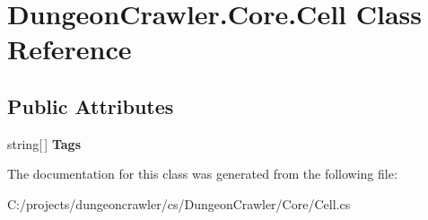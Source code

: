 \hypertarget{class_dungeon_crawler_1_1_core_1_1_cell}{}\section{Dungeon\+Crawler.\+Core.\+Cell Class Reference}
\label{class_dungeon_crawler_1_1_core_1_1_cell}
\subsection*{Public Attributes}
\begin{DoxyCompactItemize}
\item 
\hypertarget{class_dungeon_crawler_1_1_core_1_1_cell_aa3d2bdde1e93cc3604f3aa1d915eeae7}{}string\mbox{[}$\,$\mbox{]} {\bfseries Tags}\label{class_dungeon_crawler_1_1_core_1_1_cell_aa3d2bdde1e93cc3604f3aa1d915eeae7}

\end{DoxyCompactItemize}


The documentation for this class was generated from the following file\+:\begin{DoxyCompactItemize}
\item 
C\+:/projects/dungeoncrawler/cs/\+Dungeon\+Crawler/\+Core/Cell.\+cs\end{DoxyCompactItemize}
